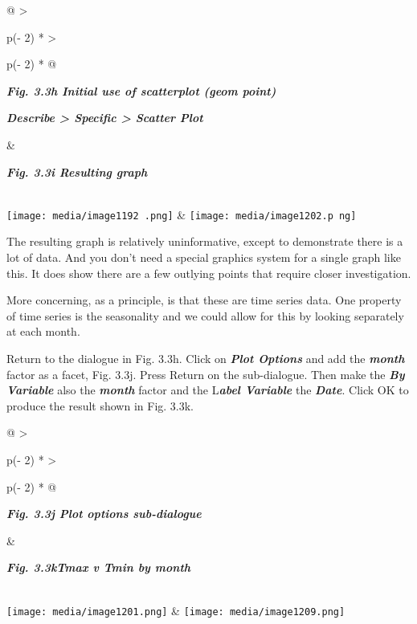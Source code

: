 \documentclass[
  letterpaper,
  DIV=11,
  numbers=noendperiod]{scrreprt}
\begin{document}
\begin{longtable}[]{@{}
  >{\raggedright\arraybackslash}p{(\columnwidth - 2\tabcolsep) * }
  >{\raggedright\arraybackslash}p{(\columnwidth - 2\tabcolsep) * }@{}}
\toprule\noalign{}
\begin{minipage}[b]{\linewidth}\raggedright
\textbf{\emph{Fig. 3.3h Initial use of scatterplot (geom point)}}

\textbf{\emph{Describe \textgreater{} Specific \textgreater{} Scatter
Plot}}
\end{minipage} & \begin{minipage}[b]{\linewidth}\raggedright
\textbf{\emph{Fig. 3.3i Resulting graph}}
\end{minipage} \\
\midrule\noalign{}
\endhead
\bottomrule\noalign{}
\endlastfoot
\texttt{[image: media/image1192 .png]}
&
\texttt{[image: media/image1202.p ng]} \\
\end{longtable}

The resulting graph is relatively uninformative, except to demonstrate
there is a lot of data. And you don't need a special graphics system for
a single graph like this. It does show there are a few outlying points
that require closer investigation.

More concerning, as a principle, is that these are time series data. One
property of time series is the seasonality and we could allow for this
by looking separately at each month.

Return to the dialogue in Fig. 3.3h. Click on \textbf{\emph{Plot
Options}} and add the \textbf{\emph{month}} factor as a facet, Fig.
3.3j. Press Return on the sub-dialogue. Then make the \textbf{\emph{By
Variable}} also the \textbf{\emph{month}} factor and the
L\textbf{\emph{abel Variable}} the \textbf{\emph{Date}}. Click OK to
produce the result shown in Fig. 3.3k.

\begin{longtable}[]{@{}
  >{\raggedright\arraybackslash}p{(\columnwidth - 2\tabcolsep) * }
  >{\raggedright\arraybackslash}p{(\columnwidth - 2\tabcolsep) * }@{}}
\toprule\noalign{}
\begin{minipage}[b]{\linewidth}\raggedright
\textbf{\emph{Fig. 3.3j Plot options sub-dialogue}}
\end{minipage} & \begin{minipage}[b]{\linewidth}\raggedright
\textbf{\emph{Fig. 3.3kTmax v Tmin by month}}
\end{minipage} \\
\midrule\noalign{}
\endhead
\bottomrule\noalign{}
\endlastfoot
\texttt{[image: media/image1201.png]}
&
\texttt{[image: media/image1209.png]} \\
\end{longtable}
\end{document}
